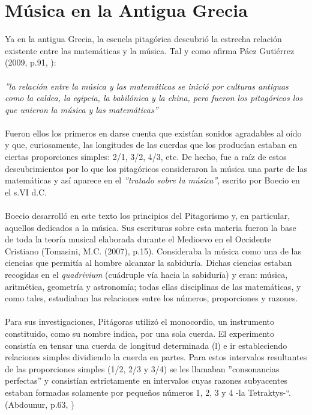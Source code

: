 \documentclass[a4paper, openright, 11pt, titlepage]{report}
\theoremstyle{definition}\newtheorem{defin}[propo]{Definition}
\theoremstyle{definition}\newtheorem{obser}[propo]{Remark}
\theoremstyle{definition}\newtheorem{ejem}[propo]{Ejemplo}
\theoremstyle{definition}\newtheorem{algoritmo}[propo]{Algoritmo}
\begin{document}
\chapter{Música en la Antigua Grecia}
Ya en la antigua Grecia, la escuela pitagórica descubrió la estrecha relación existente entre las matemáticas y la música. Tal y como afirma Páez Gutiérrez (2009, p.91, \cite{paez}):\\\\
\textit{''la relación entre la música y las matemáticas se inició por culturas antiguas como la caldea, la egipcia, la babilónica y la china, pero fueron los pitagóricos los que unieron la música y las matemáticas''}\\\\
Fueron ellos los primeros en darse cuenta que existían sonidos agradables al oído y que, curiosamente, las longitudes de las cuerdas que los producían estaban en ciertas proporciones simples: 2/1, 3/2, 4/3, etc. De hecho, fue a raíz de estos descubrimientos por lo que los pitagóricos consideraron la música una parte de las matemáticas y así aparece en el \textit{''tratado sobre la música''}, escrito por Boecio en el s.VI d.C.\\\\
Boecio desarrolló en este texto los principios del Pitagorismo y, en particular, aquellos dedicados a la música. Sus escrituras sobre esta materia fueron la base de toda la teoría musical elaborada durante el Medioevo en el Occidente Cristiano \cite{tomasini} (Tomasini, M.C. (2007), p.15). Consideraba la música como una de las ciencias que permitía al hombre alcanzar la sabiduría. Dichas ciencias estaban recogidas en el \textit{quadrivium} (cuádruple vía hacia la sabiduría) y eran: música, aritmética, geometría y astronomía; todas ellas disciplinas de las matemáticas, y como tales, estudiaban las relaciones entre los números, proporciones y razones.\\\\
Para sus investigaciones, Pitágoras utilizó el monocordio, un instrumento constituido, como su nombre indica, por una sola cuerda. El experimento consistía en tensar una cuerda de longitud determinada (l) e ir estableciendo relaciones simples dividiendo la cuerda en partes. Para estos intervalos resultantes de las proporciones simples (1/2, 2/3 y 3/4) se les llamaban ''consonancias perfectas'' y consistían estrictamente en intervalos cuyas razones subyacentes estaban formadas solamente por pequeños números 1, 2, 3 y 4 -la Tetraktys-“. (Abdounur, p.63, \cite{abd})\\\\
\end{document}
